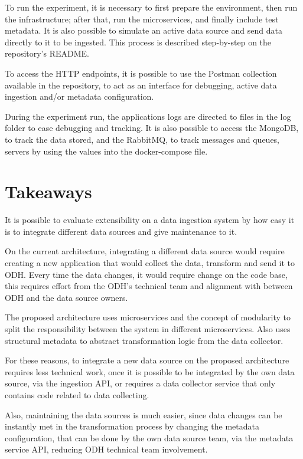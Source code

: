 To run the experiment, it is necessary to first prepare the environment, then run the infrastructure; after that, run the microservices, and finally include test metadata. It is also possible to simulate an active data source and send data directly to it to be ingested. This process is described step-by-step on the repository's README.

To access the HTTP endpoints, it is possible to use the Postman collection available in the repository, to act as an interface for debugging, active data ingestion and/or metadata configuration.

During the experiment run, the applications logs are directed to files in the log folder to ease debugging and tracking. It is also possible to access the MongoDB, to track the data stored, and the RabbitMQ, to track messages and queues, servers by using the values into the docker-compose file.

\section{Takeaways}
\label{sec:conc}

It is possible to evaluate extensibility on a data ingestion system by how easy it is to integrate different data sources and give maintenance to it.

On the current architecture, integrating a different data source would require creating a new application that would collect the data, transform and send it to ODH. Every time the data changes, it would require change on the code base, this requires effort from the ODH's technical team and alignment with between ODH and the data source owners.

The proposed architecture uses microservices and the concept of modularity to split the responsibility between the system in different microservices. Also uses structural metadata to abstract transformation logic from the data collector.

For these reasons, to integrate a new data source on the proposed architecture requires less technical work, once it is possible to be integrated by the own data source, via the ingestion API, or requires a data collector service that only contains code related to data collecting.

Also, maintaining the data sources is much easier, since data changes can be instantly met in the transformation process by changing the metadata configuration, that can be done by the own data source team, via the metadata service API, reducing ODH technical team involvement.


